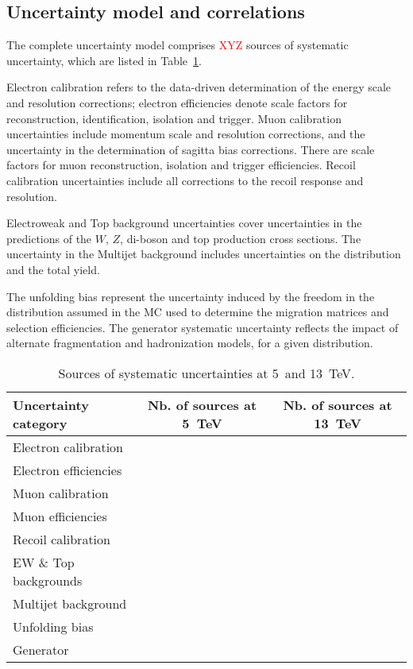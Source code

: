 \subsection{Uncertainty model and correlations}

The complete uncertainty model comprises \textcolor{red}{XYZ} sources of systematic uncertainty, which are listed in Table~\ref{tab:sources}.

Electron calibration refers to the data-driven determination of the energy scale and resolution corrections; electron efficiencies denote
scale factors for reconstruction, identification, isolation and trigger. Muon calibration uncertainties include momentum scale and resolution corrections, and the uncertainty in the determination of sagitta bias corrections. There are scale factors for muon reconstruction, isolation and trigger efficiencies. Recoil calibration uncertainties include all corrections to the recoil response and resolution.

Electroweak and Top background uncertainties cover uncertainties in the predictions of the $W$, $Z$, di-boson and top production cross sections. The uncertainty in the Multijet background includes uncertainties on the distribution and the total yield.

The unfolding bias represent the uncertainty induced by the freedom in the \ptw distribution assumed in the MC used to determine the migration matrices and selection efficiencies. The generator systematic uncertainty reflects the impact of alternate fragmentation and hadronization models, for a given \ptw distribution.

\begin{table}[htbp]
  \centering
  \begin{tabular}{lcc}
    \toprule
    Uncertainty category & Nb. of sources at 5~TeV & Nb. of sources at 13~TeV \\
    \midrule
    Electron calibration & \\
    Electron efficiencies & \\
    Muon calibration & \\
    Muon efficiencies & \\
    Recoil calibration & \\
    EW \& Top backgrounds & \\
    Multijet background & \\
    Unfolding bias & \\
    Generator & \\
    \bottomrule
  \end{tabular}
  \caption{Sources of systematic uncertainties at 5~and 13~TeV.\label{tab:sources}}
\end{table}

